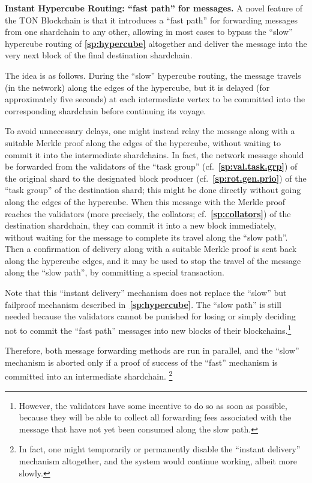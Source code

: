 \documentclass[12pt,oneside]{article}
\def\makepoint#1{\medbreak\noindent{\bf #1.\ }}
\def\nxsubpoint{\refstepcounter{subsubsection}%
  \smallbreak\makepoint{\thesubsubsection}}
\def\refpoint#1{{\rm\textbf{\ref{#1}}}}
\let\ptref=\refpoint
\def\embt(#1.){\textbf{#1.}}
\begin{document}
\nxsubpoint\label{sp:instant.hypercube} \embt(Instant Hypercube
Routing: ``fast path'' for messages.)  A novel feature of the TON
Blockchain is that it introduces a ``fast path'' for forwarding
messages from one shardchain to any other, allowing in most cases to
bypass the ``slow'' hypercube routing of \ptref{sp:hypercube}
altogether and deliver the message into the very next block of the
final destination shardchain.

The idea is as follows. During the ``slow'' hypercube routing, the
message travels (in the network) along the edges of the hypercube, but
it is delayed (for approximately five seconds) at each intermediate
vertex to be committed into the corresponding shardchain before
continuing its voyage. 

To avoid unnecessary delays, one might instead relay the message along
with a suitable Merkle proof along the edges of the hypercube, without
waiting to commit it into the intermediate shardchains. In fact, the
network message should be forwarded from the validators of the ``task
group'' (cf.~\ptref{sp:val.task.grp}) of the original shard to the
designated block producer (cf.~\ptref{sp:rot.gen.prio}) of the ``task
group'' of the destination shard; this might be done directly without
going along the edges of the hypercube. When this message with the
Merkle proof reaches the validators (more precisely, the collators;
cf.~\ptref{sp:collators}) of the destination shardchain, they can
commit it into a new block immediately, without waiting for the
message to complete its travel along the ``slow path''. Then a
confirmation of delivery along with a suitable Merkle proof is sent
back along the hypercube edges, and it may be used to stop the travel
of the message along the ``slow path'', by committing a special
transaction.

Note that this ``instant delivery'' mechanism does not replace the
``slow'' but failproof mechanism described
in~\ptref{sp:hypercube}. The ``slow path'' is still needed because the
validators cannot be punished for losing or simply deciding not to
commit the ``fast path'' messages into new blocks of their
blockchains.\footnote{However, the validators have some incentive to do
  so as soon as possible, because they will be able to collect all
  forwarding fees associated with the message that have not yet been
  consumed along the slow path.}

Therefore, both message forwarding methods are run in parallel, and
the ``slow'' mechanism is aborted only if a proof of success of the
``fast'' mechanism is committed into an intermediate shardchain.%
\footnote{In fact, one might temporarily or permanently disable the
  ``instant delivery'' mechanism altogether, and the system would
  continue working, albeit more slowly.}
\end{document}
